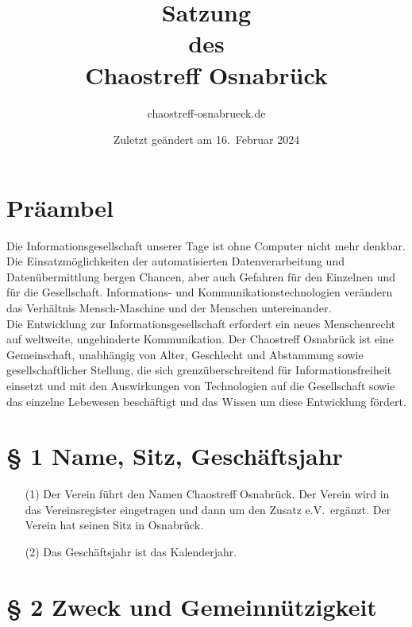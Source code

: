\documentclass[12pt,paper=a4,ngerman]{scrreprt}
\title{Satzung\\des\\Chaostreff Osnabrück} \author{chaostreff-osnabrueck.de}
\date{Zuletzt geändert am 16.\ Februar 2024}
\begin{document}
\maketitle
\tableofcontents
\newpage

\section{Präambel}

Die Informationsgesellschaft unserer Tage ist ohne Computer nicht mehr
denkbar. Die Einsatzmöglichkeiten der automatisierten
Datenverarbeitung und Datenübermittlung bergen Chancen, aber auch
Gefahren für den Einzelnen und für die Gesellschaft. Infor\-mations-
und Kommunikationstechnologien verändern das Verhältnis
Mensch-Maschine und der Menschen untereinander. \\
Die Entwicklung zur Informationsgesellschaft erfordert ein neues
Menschenrecht auf weltweite, ungehinderte Kommunikation. Der
Chaostreff Osnabrück ist eine Gemeinschaft, unabhängig von Alter,
Geschlecht und Abstammung sowie gesellschaftlicher Stellung, die sich
grenzüberschreitend für Informationsfreiheit einsetzt und mit den
Auswirkungen von Technologien auf die Gesellschaft sowie das einzelne
Lebewesen beschäftigt und das Wissen um diese Entwicklung fördert.

\section{\S{} 1 Name, Sitz, Geschäftsjahr}

\begin{itemize}
\item[(1)]
Der Verein führt den Namen \glqq Chaostreff
Osnabrück\grqq. Der Verein wird in das Vereinsregister eingetragen und
dann um den Zusatz \glqq e.V.\grqq\ ergänzt. Der Verein hat seinen
Sitz in Osnabrück.
\item[(2)]
Das Geschäftsjahr ist das Kalenderjahr.
\end{itemize}

\section{\S{} 2 Zweck und Gemeinnützigkeit}
\end{document}
